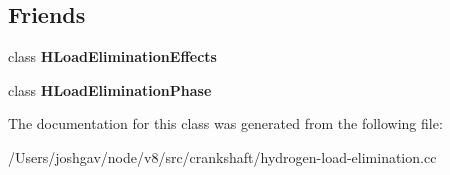 \subsection*{Friends}
\begin{DoxyCompactItemize}
\item 
class {\bfseries H\+Load\+Elimination\+Effects}\hypertarget{classv8_1_1internal_1_1_h_load_elimination_table_a0ea56273a59d73214d283f82893e5705}{}\label{classv8_1_1internal_1_1_h_load_elimination_table_a0ea56273a59d73214d283f82893e5705}

\item 
class {\bfseries H\+Load\+Elimination\+Phase}\hypertarget{classv8_1_1internal_1_1_h_load_elimination_table_a731516ccfd3fc2a75f4c50eb591ec9df}{}\label{classv8_1_1internal_1_1_h_load_elimination_table_a731516ccfd3fc2a75f4c50eb591ec9df}

\end{DoxyCompactItemize}


The documentation for this class was generated from the following file\+:\begin{DoxyCompactItemize}
\item 
/\+Users/joshgav/node/v8/src/crankshaft/hydrogen-\/load-\/elimination.\+cc\end{DoxyCompactItemize}
